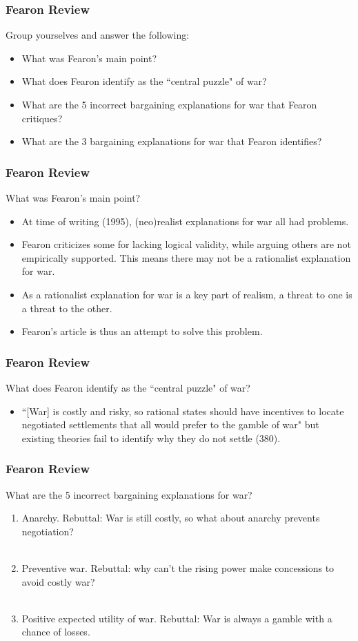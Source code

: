 \documentclass[handout]{beamer}
\begin{document}
\begin{frame} 
	\frametitle{\LARGE{Fearon Review}}
	Group yourselves and answer the following:
	\begin{itemize}
		\item What was Fearon's main point?
		\item What does Fearon identify as the ``central puzzle" of war?
		\item What are the 5 incorrect bargaining explanations for war that Fearon critiques?
		\item What are the 3 bargaining explanations for war that Fearon identifies?
	\end{itemize}
\end{frame}

\begin{frame} 
	\frametitle{\LARGE{Fearon Review}}
	What was Fearon's main point? \pause
	\begin{itemize}
		\item At time of writing (1995), (neo)realist explanations for war all had problems. \pause
		\item Fearon criticizes some for lacking logical validity, while arguing others are not empirically supported. This means there may not be a rationalist explanation for war. \pause
		\item As a rationalist explanation for war is a key part of realism, a threat to one is a threat to the other. \pause
		\item Fearon's article is thus an attempt to solve this problem.
	\end{itemize}
\end{frame}

\begin{frame} 
	\frametitle{\LARGE{Fearon Review}}
	What does Fearon identify as the ``central puzzle" of war? \pause
	\begin{itemize}
		\item ``[War] is costly and risky, so rational states should have incentives to locate negotiated settlements that all would prefer to the gamble of war" but existing theories fail to identify why they do not settle (380).
	\end{itemize}
\end{frame}

\begin{frame} 
	\frametitle{\LARGE{Fearon Review}}
	 What are the 5 incorrect bargaining explanations for war? \pause
	\begin{enumerate}
		\item Anarchy. \pause Rebuttal: War is still costly, so what about anarchy prevents negotiation?
		\\~\\
		\item Preventive war. \pause Rebuttal: why can't the rising power make concessions to avoid costly war?
		\\~\\
		\item Positive expected utility of war. \pause Rebuttal: War is always a gamble with a chance of losses.
	\end{enumerate}
\end{frame}
\end{document}
